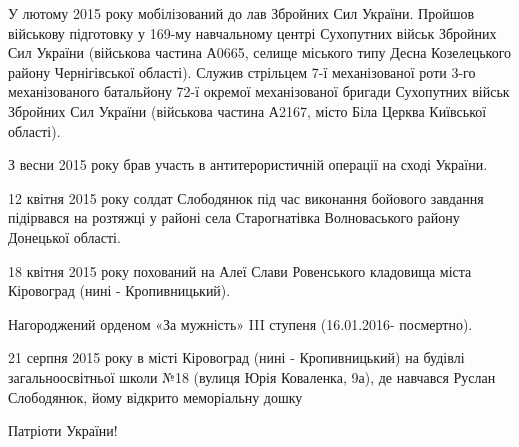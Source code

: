 У лютому 2015 року мобілізований до лав Збройних Сил України. Пройшов військову
підготовку у 169-му навчальному центрі Сухопутних військ Збройних Сил України
(військова частина А0665, селище міського типу Десна Козелецького району
Чернігівської області). Служив стрільцем 7-ї механізованої роти 3-го
механізованого батальйону 72-ї окремої механізованої бригади Сухопутних військ
Збройних Сил України (військова частина А2167, місто Біла Церква Київської
області).

З весни 2015 року брав участь в антитерористичній операції на сході України.

12 квітня 2015 року солдат Слободянюк під час виконання бойового завдання
підірвався на розтяжці у районі села Старогнатівка Волноваського району
Донецької області.

18 квітня 2015 року похований на Алеї Слави Ровенського кладовища міста
Кіровоград (нині - Кропивницький).

Нагороджений орденом «За мужність» III ступеня (16.01.2016- посмертно).

21 серпня 2015 року в місті Кіровоград (нині - Кропивницький) на будівлі
загальноосвітньої школи №18 (вулиця Юрія Коваленка, 9а), де навчався Руслан
Слободянюк, йому відкрито меморіальну дошку

Патріоти України!
